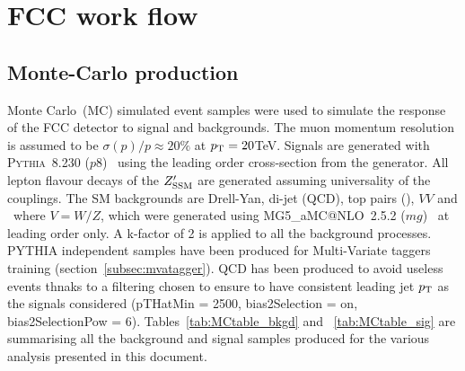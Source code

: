 \section{FCC work flow}
\label{sec:fccworkflow}

\subsection{Monte-Carlo production}
\label{subsec:mcprod}

Monte Carlo~(MC) simulated event samples were used to simulate the response of the FCC detector to signal and backgrounds. The muon momentum resolution is assumed to be $\sigma(p)/p \approx 20\%$ at $p_{\text{T}}= 20 $TeV. Signals are generated with {\scshape Pythia}~8.230 ($p8$)~\cite{Sjostrand:2014zea} using the leading order cross-section from the generator.
All lepton flavour decays of the $Z^{\prime}_{\mathrm{SSM}}$ are generated assuming universality of the couplings.
The SM backgrounds are Drell-Yan, di-jet (QCD), top pairs (\ttbar), $VV$ and \vj\ where $V=W/Z$, which were generated using {\scshape MG5\_}a{\scshape MC@NLO}~2.5.2 ($mg$)~\cite{Alwall:2014hca} at leading order only. A k-factor of 2 is applied to all the background processes. \newline
PYTHIA independent samples have been produced for Multi-Variate taggers training (section~\ref{subsec:mvatagger}). QCD has been produced to avoid useless events thnaks to a filtering chosen to ensure to have consistent leading jet $p\sb{\scriptstyle\mathrm{T}}$ as the signals considered (pTHatMin = 2500, bias2Selection = on, bias2SelectionPow = 6).\newline
Tables~\ref{tab:MCtable_bkgd} and ~\ref{tab:MCtable_sig} are summarising all the background and signal samples produced for the various analysis presented in this document.

